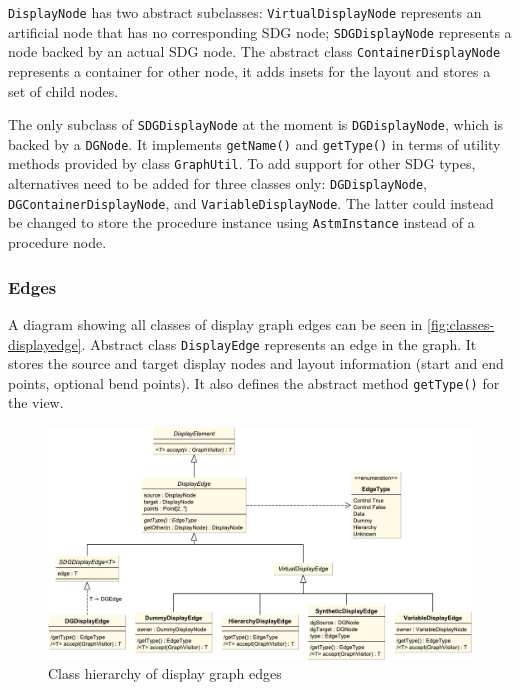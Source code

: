\lstinline|DisplayNode| has two abstract subclasses: \lstinline|VirtualDisplayNode| represents an artificial node that 
has no corresponding SDG node; \lstinline|SDGDisplayNode| represents a node backed by an actual SDG node. The abstract 
class \lstinline|ContainerDisplayNode| represents a container for other node, it adds insets for the layout and stores 
a set of child nodes.

The only subclass of \lstinline|SDGDisplayNode| at the moment is \lstinline|DGDisplayNode|, which is backed by a 
\lstinline|DGNode|. It implements \lstinline|getName()| and \lstinline|getType()| in terms of utility methods provided 
by class \lstinline|GraphUtil|. To add support for other SDG types, alternatives need to be added for three classes 
only: \lstinline|DGDisplayNode|, \lstinline|DGContainerDisplayNode|, and \lstinline|VariableDisplayNode|. The latter 
could instead be changed to store the procedure instance using \lstinline|AstmInstance| instead of a procedure node.

\subsubsection{Edges}

A diagram showing all classes of display graph edges can be seen in \autoref{fig:classes-displayedge}. Abstract class 
\lstinline|DisplayEdge| represents an edge in the graph. It stores the source and target display nodes and layout 
information (start and end points, optional bend points). It also defines the abstract method \lstinline|getType()| for 
the view.

\begin{figure}
  \centering
    \includegraphics[scale=0.5]{bilder/classes-displayedge}
  \caption{Class hierarchy of display graph edges}
  \label{fig:classes-displayedge}
\end{figure}

